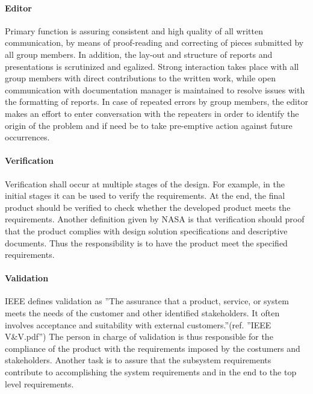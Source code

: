 \paragraph{Editor}
Primary function is assuring consistent and high quality of all written communication, by means of proof-reading and correcting of pieces submitted by all group members. In addition, the lay-out and structure of reports and presentations is scrutinized and egalized. Strong interaction takes place with all group members with direct contributions to the written work, while open communication with documentation manager is maintained to resolve issues with the formatting of reports. In case of repeated errors by group members, the editor makes an effort to enter conversation with the repeaters in order to identify the origin of the problem and if need be to take pre-emptive action against future occurrences.
\paragraph{Verification}
Verification shall occur at multiple stages of the design. For example, in the initial stages it can be used to verify the requirements. At the end, the final product should be verified to check whether the developed product meets the requirements. Another definition given by NASA is that verification should proof that the product complies with design solution specifications and descriptive documents. Thus the responsibility is to have the product meet the specified requirements.

\paragraph{Validation}
IEEE defines validation as ''The assurance that a product, service, or system meets the needs of the customer and other identified stakeholders. It often involves acceptance and suitability with external customers.''(ref. ''IEEE V\&V.pdf'') The person in charge of validation is thus responsible for the compliance of the product with the requirements imposed by the costumers and stakeholders. Another task is to assure that the subsystem requirements contribute to accomplishing the system requirements and in the end to the top level requirements.

